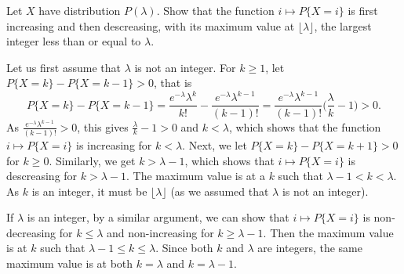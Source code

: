\begin{exercise}
  Let $X$ have distribution $P(\lambda)$. Show that the function $i\mapsto P\{X=i\}$ is first increasing and then descreasing, with its maximum value at $\lfloor\lambda\rfloor$, the largest integer less than or equal to $\lambda$.
\end{exercise}
\begin{solution}
  Let us first assume that $\lambda$ is not an integer. For $k\geq 1$, let $P\{X=k\} - P\{X=k-1\} > 0$, that is
  \[ P\{X=k\} - P\{X=k-1\} = \frac{e^{-\lambda}\lambda^{k}}{k!} - \frac{e^{-\lambda}\lambda^{k-1}}{(k-1)!} = \frac{e^{-\lambda}\lambda^{k-1}}{(k-1)!}\big(\frac{\lambda}{k} -1\big) > 0 .\]
  As $\frac{e^{-\lambda}\lambda^{k-1}}{(k-1)!}>0$, this gives $\frac{\lambda}{k}-1> 0$ and $k<\lambda$, which shows that the function $i\mapsto P\{X=i\}$ is increasing for $k<\lambda$. Next, we let $P\{X=k\} - P\{X=k+1\} > 0$ for $k\geq 0$. Similarly, we get $k > \lambda - 1$, which shows that $i\mapsto P\{X=i\}$ is descreasing for $k>\lambda - 1$. The maximum value is at a $k$ such that $\lambda-1<k<\lambda$. As $k$ is an integer, it must be $\lfloor\lambda\rfloor$ (as we assumed that $\lambda$ is not an integer).

  If $\lambda$ is an integer, by a similar argument, we can show that $i\mapsto P\{X=i\}$ is non-decreasing for $k\leq\lambda$ and non-increasing for $k\geq\lambda-1$. Then the maximum value is at $k$ such that $\lambda-1\leq k\leq \lambda$. Since both $k$ and $\lambda$ are integers, the same maximum value is at both $k=\lambda$ and $k=\lambda -1$.
\end{solution}
